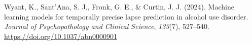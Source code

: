 \documentclass[
  letterpaper,
  DIV=11,
  numbers=noendperiod]{scrartcl}
\newlength{\cslhangindent}
\newenvironment{CSLReferences}[2] %
 {\begin{list}{}{%
  \setlength{\itemindent}{0pt}
  \setlength{\leftmargin}{0pt}
  \setlength{\parsep}{0pt}
  \ifodd #1
   \setlength{\leftmargin}{\cslhangindent}
   \setlength{\itemindent}{-1\cslhangindent}
  \fi
  \setlength{\itemsep}{#2\baselineskip}}}
 {\end{list}}
\begin{document}
\begin{CSLReferences}{1}{0}
Wyant, K., Sant'Ana, S. J., Fronk, G. E., \& Curtin, J. J. (2024).
Machine learning models for temporally precise lapse prediction in
alcohol use disorder. \emph{Journal of Psychopathology and Clinical
Science}, \emph{133}(7), 527--540.
\url{https://doi.org/10.1037/abn0000901}

\end{CSLReferences}
\end{document}
